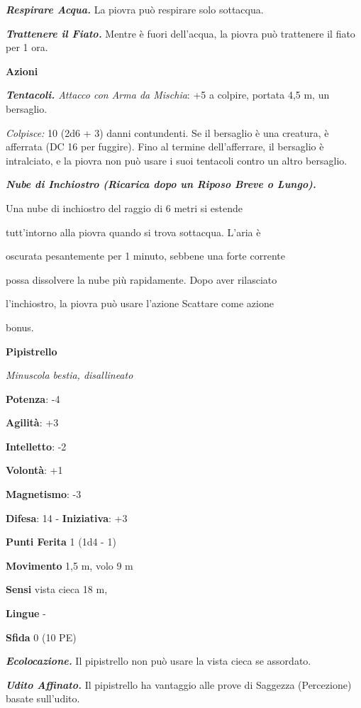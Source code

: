 \begin{multicols}{2}
\emph{\textbf{Respirare Acqua.}} La piovra può respirare solo sottacqua.

\emph{\textbf{Trattenere il Fiato.}} Mentre è fuori dell'acqua, la
piovra può trattenere il fiato per 1 ora.

\smallskip\textbf{Azioni}

\emph{\textbf{Tentacoli.} Attacco con Arma da Mischia}: +5 a colpire,
portata 4,5 m, un bersaglio.

\emph{Colpisce:} 10 (2d6 + 3) danni contundenti. Se il bersaglio è una
creatura, è afferrata (DC 16 per fuggire). Fino al termine
dell'afferrare, il bersaglio è intralciato, e la piovra non può usare i
suoi tentacoli contro un altro bersaglio.

\emph{\textbf{Nube di Inchiostro (Ricarica dopo un Riposo Breve o
Lungo).}}

Una nube di inchiostro del raggio di 6 metri si estende

tutt'intorno alla piovra quando si trova sottacqua. L'aria è

oscurata pesantemente per 1 minuto, sebbene una forte corrente

possa dissolvere la nube più rapidamente. Dopo aver rilasciato

l'inchiostro, la piovra può usare l'azione Scattare come azione

bonus.

\textbf{Pipistrello}

\emph{Minuscola bestia, disallineato}

\textbf{Potenza}: -4

\textbf{Agilità}: +3

\textbf{Intelletto}: -2

\textbf{Volontà}: +1

\textbf{Magnetismo}: -3

\textbf{Difesa}: 14 - \textbf{Iniziativa}: +3

\textbf{Punti Ferita} 1 (1d4 - 1)

\textbf{Movimento} 1,5 m, volo 9 m

\textbf{Sensi} vista cieca 18 m, 

\textbf{Lingue} -

\textbf{Sfida} 0 (10 PE)\smallskip

\emph{\textbf{Ecolocazione.}} Il pipistrello non può usare la vista
cieca se assordato.

\emph{\textbf{Udito Affinato.}} Il pipistrello ha vantaggio alle prove
di Saggezza (Percezione) basate sull'udito.


\end{multicols}
